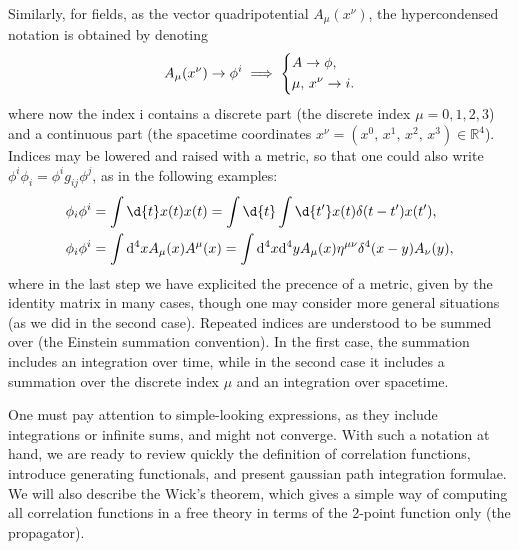 Similarly, for fields, as the vector quadripotential \(A_\mu(x^{\nu})\), the hypercondensed notation is obtained by denoting
\[
    A_\mu (x^{\nu}) \to \phi^i \implies \begin{dcases}
        A \to \phi, \\
        \mu,\, x^{\nu} \to i.
    \end{dcases}
\]
where now the index i contains a discrete part (the discrete index \(\mu = 0, 1, 2, 3\)) and a continuous part (the spacetime coordinates \(x^{\nu} = (x^0,\,x^1,\,x^2,\,x^3) \in \mathbb{R}^4\)). Indices may be lowered and raised with a metric, so that one could also write \(\phi^i \phi_i = \phi^i g_{ij} \phi^j\), as in the following examples:
\[
    \begin{aligned}
        \phi_i \phi^i & = \int \d{t} x(t)x(t) = \int \d{t} \int \d{t^{\prime}} x(t)\delta(t-t^{\prime})x(t^{\prime}),                               \\
        \phi_i \phi^i & = \int \mathrm{d}^4 x A_\mu(x) A^\mu(x) = \int \mathrm{d}^4 x \mathrm{d}^4 y A_\mu(x) \eta^{\mu\nu} \delta^4(x-y) A_\nu(y),
    \end{aligned}
\]
where in the last step we have explicited the precence of a metric, given by the identity matrix in many cases, though one may consider more general situations (as we did in the second case). Repeated indices are understood to be summed over (the Einstein summation convention). In the first case, the summation includes an integration over time, while in the second case it includes a summation over the discrete index \(\mu\) and an integration over spacetime.

One must pay attention to simple-looking expressions, as they include integrations or infinite sums, and might not converge. With such a notation at hand, we are ready to review quickly the definition of correlation functions, introduce generating functionals, and present gaussian path integration formulae. We will also describe the Wick’s theorem, which gives a simple way of computing all correlation functions in a free theory in terms of the 2-point function only (the propagator).

